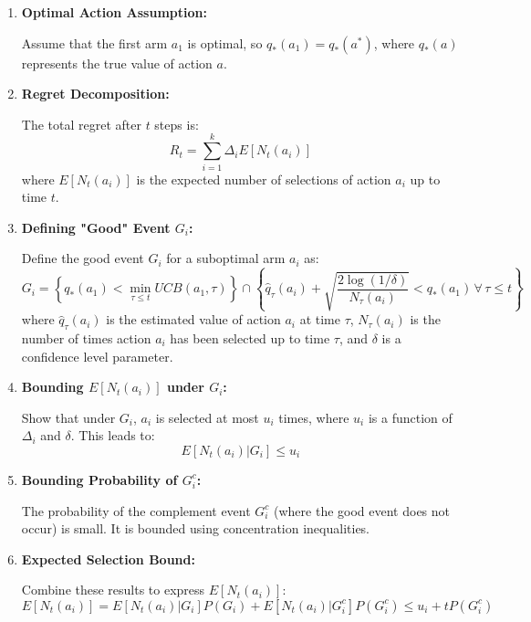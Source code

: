 \documentclass{article}
\begin{document}
\begin{enumerate}[a)]
\begin{itemize}
\begin{enumerate}
    \item \textbf{Optimal Action Assumption:}\par 
    Assume that the first arm \( a_1 \) is optimal, so \( q_*(a_1) = q_*(a^*) \), where \( q_*(a) \) represents the true value of action \( a \).\par

    \item \textbf{Regret Decomposition:}\par 
    The total regret after \( t \) steps is:
    \[ R_t = \sum_{i=1}^{k} \Delta_i E[N_t(a_i)] \]
    where \( E[N_t(a_i)] \) is the expected number of selections of action \( a_i \) up to time \( t \).\par

    \item \textbf{Defining "Good" Event \( G_i \):}\par 
    Define the good event \( G_i \) for a suboptimal arm \( a_i \) as:
    \[ G_i = \left\{ q_*(a_1) < \min_{\tau \leq t} UCB(a_1, \tau) \right\} \cap \left\{ \hat{q}_\tau(a_i) + \sqrt{\frac{2 \log(1/\delta)}{N_\tau(a_i)}} < q_*(a_1) \, \forall \, \tau \leq t \right\} \]
    where \( \hat{q}_\tau(a_i) \) is the estimated value of action \( a_i \) at time \( \tau \), \( N_\tau(a_i) \) is the number of times action \( a_i \) has been selected up to time \( \tau \), and \( \delta \) is a confidence level parameter.\par

    \item \textbf{Bounding \( E[N_t(a_i)] \) under \( G_i \):}\par 
    Show that under \( G_i \), \( a_i \) is selected at most \( u_i \) times, where \( u_i \) is a function of \( \Delta_i \) and \( \delta \). This leads to:
    \[ E[N_t(a_i)|G_i] \leq u_i \]\par

    \item \textbf{Bounding Probability of \( G^c_i \):}\par 
    The probability of the complement event \( G^c_i \) (where the good event does not occur) is small. It is bounded using concentration inequalities.\par

    \item \textbf{Expected Selection Bound:}\par 
    Combine these results to express \( E[N_t(a_i)] \):
    \[ E[N_t(a_i)] = E[N_t(a_i)|G_i]P(G_i) + E[N_t(a_i)|G^c_i]P(G^c_i) \leq u_i + t P(G^c_i) \]\par


\end{enumerate}
\end{itemize}
\end{enumerate}
\end{document}
